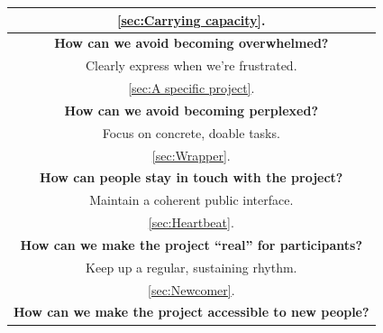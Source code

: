 \begin{table}
{\begin{tabularx}{\textwidth}{|C|}
\vspace{-.4em} \color{Black} \ref{sec:Carrying capacity}. \vspace{.4em}\\
\hline
\vspace{.01em}
\textbf{How can we avoid becoming overwhelmed?}\\
Clearly express when we're frustrated.
\vspace{.4em}\\
\hline
\vspace{-.4em} \color{Black} \ref{sec:A specific project}. \vspace{.4em}\\
\hline
\vspace{.01em}
\textbf{How can we avoid becoming perplexed?}\\
Focus on concrete, doable tasks.
\vspace{.4em}\\
\hline
\vspace{-.4em} \color{Black} \ref{sec:Wrapper}. \vspace{.4em}\\
\hline
\vspace{.01em}
\textbf{How can people stay in touch with the project?}\\
Maintain a coherent public interface.
\vspace{.4em}\\
\hline
\vspace{-.4em} \color{Black} \ref{sec:Heartbeat}. \vspace{.4em}\\
\hline
\vspace{.01em}
\textbf{How can we make the project ``real'' for participants?}\\
Keep up a regular, sustaining rhythm.
\vspace{.4em}\\
\hline
\vspace{-.4em} \color{Black} \ref{sec:Newcomer}. \vspace{.4em}\\
\hline
\vspace{.01em}
\textbf{How can we make the project accessible to new people?}\\

\end{tabularx}}
\end{table}
